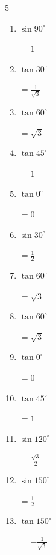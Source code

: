 \begin{multicols}{5}
\begin{enumerate}
        $\displaystyle =\frac{\sqrt{3}}{2}$

  \item $\displaystyle \sin{90^\circ}$

        $\displaystyle =1$

  \item $\displaystyle \tan{30^\circ}$

        $\displaystyle =\frac{1}{\sqrt{3}}$

  \item $\displaystyle \tan{60^\circ}$

        $\displaystyle =\sqrt{3}$

  \item $\displaystyle \tan{45^\circ}$

        $\displaystyle =1$

  \item $\displaystyle \tan{0^\circ}$

        $\displaystyle =0$

  \item $\displaystyle \sin{30^\circ}$

        $\displaystyle =\frac{1}{2}$

  \item $\displaystyle \tan{60^\circ}$

        $\displaystyle =\sqrt{3}$

  \item $\displaystyle \tan{60^\circ}$

        $\displaystyle =\sqrt{3}$

\columnbreak %

  \item $\displaystyle \tan{0^\circ}$

        $\displaystyle =0$

  \item $\displaystyle \tan{45^\circ}$

        $\displaystyle =1$

  \item $\displaystyle \sin{120^\circ}$

        $\displaystyle =\frac{\sqrt{3}}{2}$

  \item $\displaystyle \sin{150^\circ}$

        $\displaystyle =\frac{1}{2}$

  \item $\displaystyle \tan{150^\circ}$

        $\displaystyle =-\frac{1}{\sqrt{3}}$


\end{enumerate}
\end{multicols}
